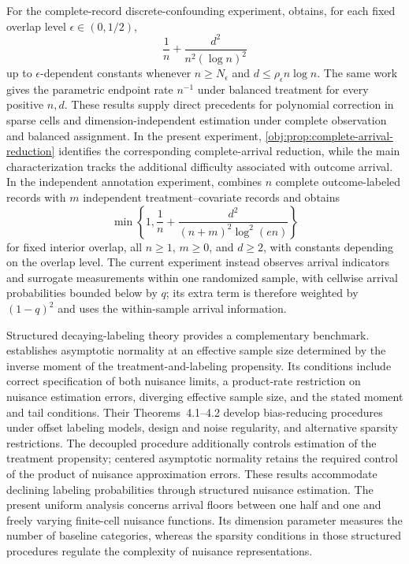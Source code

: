 \documentclass[11pt]{article}
\begin{document}
For the complete-record discrete-confounding experiment, \citet[Sharp fixed-interior minimax theorem]{CausalSmith2026} obtains, for each fixed overlap level \(\epsilon\in(0,1/2)\),
\[
\frac1n+\frac{d^2}{n^2(\log n)^2}
\]
up to \(\epsilon\)-dependent constants whenever \(n\ge N_\epsilon\) and \(d\le\rho_\epsilon n\log n\). The same work gives the parametric endpoint rate \(n^{-1}\) under balanced treatment for every positive \(n,d\). These results supply direct precedents for polynomial correction in sparse cells and dimension-independent estimation under complete observation and balanced assignment. In the present experiment, \cref{obj:prop:complete-arrival-reduction} identifies the corresponding complete-arrival reduction, while the main characterization tracks the additional difficulty associated with outcome arrival. In the independent annotation experiment, \citet[Sharp annotation frontier theorem]{CausalSmith2026Annotation} combines \(n\) complete outcome-labeled records with \(m\) independent treatment--covariate records and obtains
\[
\min\left\{1,\frac1n+\frac{d^2}{(n+m)^2\log^2(en)}\right\}
\]
for fixed interior overlap, all \(n\ge1\), \(m\ge0\), and \(d\ge2\), with constants depending on the overlap level. The current experiment instead observes arrival indicators and surrogate measurements within one randomized sample, with cellwise arrival probabilities bounded below by \(q\); its extra term is therefore weighted by \((1-q)^2\) and uses the within-sample arrival information.

Structured decaying-labeling theory provides a complementary benchmark. \citet[Theorem~2.2 and equation~(2.4)]{ZhangChakraborttyBradic2025} establishes asymptotic normality at an effective sample size determined by the inverse moment of the treatment-and-labeling propensity. Its conditions include correct specification of both nuisance limits, a product-rate restriction on nuisance estimation errors, diverging effective sample size, and the stated moment and tail conditions. Their Theorems~4.1--4.2 develop bias-reducing procedures under offset labeling models, design and noise regularity, and alternative sparsity restrictions. The decoupled procedure additionally controls estimation of the treatment propensity; centered asymptotic normality retains the required control of the product of nuisance approximation errors. These results accommodate declining labeling probabilities through structured nuisance estimation. The present uniform analysis concerns arrival floors between one half and one and freely varying finite-cell nuisance functions. Its dimension parameter measures the number of baseline categories, whereas the sparsity conditions in those structured procedures regulate the complexity of nuisance representations.
\end{document}

